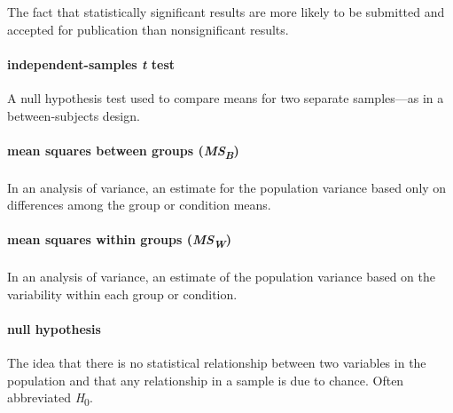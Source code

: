 \documentclass[
]{krantz}
\begin{document}
The fact that statistically significant results are more likely to be submitted and accepted for publication than nonsignificant results.

\hypertarget{independent-samples-t-test}{%
\paragraph*{\texorpdfstring{independent-samples \emph{t} test}{independent-samples t test}}\label{independent-samples-t-test}}

A null hypothesis test used to compare means for two separate samples---as in a between-subjects design.

\hypertarget{mean-squares-between-groups-msb}{%
\paragraph*{\texorpdfstring{mean squares between groups (\emph{MS\textsubscript{B}})}{mean squares between groups (MSB)}}\label{mean-squares-between-groups-msb}}

In an analysis of variance, an estimate for the population variance based only on differences among the group or condition means.

\hypertarget{mean-squares-within-groups-msw}{%
\paragraph*{\texorpdfstring{mean squares within groups (\emph{MS\textsubscript{W}})}{mean squares within groups (MSW)}}\label{mean-squares-within-groups-msw}}

In an analysis of variance, an estimate of the population variance based on the variability within each group or condition.

\hypertarget{null-hypothesis}{%
\paragraph*{null hypothesis}\label{null-hypothesis}}

The idea that there is no statistical relationship between two variables in the population and that any relationship in a sample is due to chance. Often abbreviated \emph{H}\textsubscript{0}.
\end{document}

